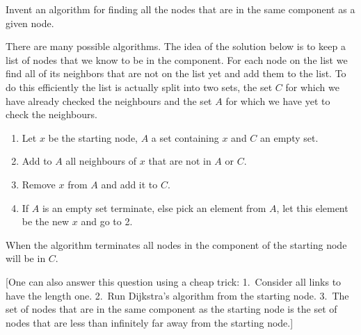 
Invent an algorithm for finding all the nodes that are in the same component as a given node. 
 
\solution
There are many possible algorithms. The idea of the solution below is to keep a list of nodes that we know to be in the component. For each node on the list we find all of its neighbors that are not on the list yet and add them to the list. To do this efficiently the list is actually split into two sets, the set $C$ for which we have already checked the neighbours and the set $A$ for which we have yet to check the neighbours.  
\begin{enumerate}[label=\arabic*.]
    \item Let $x$ be the starting node, $A$ a set containing $x$ and $C$ an empty set.
    \item Add to $A$ all neighbours of $x$ that are not in $A$ or $C$.
    \item Remove $x$ from $A$ and add it to $C$. 
    \item If $A$ is an empty set terminate, else pick an element from $A$, let this element be the new $x$ and go to  2. 
\end{enumerate}
When the algorithm terminates all nodes in the component of the starting node will be in $C$.   

[One can also answer this question using a cheap trick: 1.~Consider all links to have the length one. 2.~Run Dijkstra's algorithm from the starting node. 3.~The set of nodes that are in the same component as the starting node is the set of nodes that are less than infinitely far away from the starting node.]
